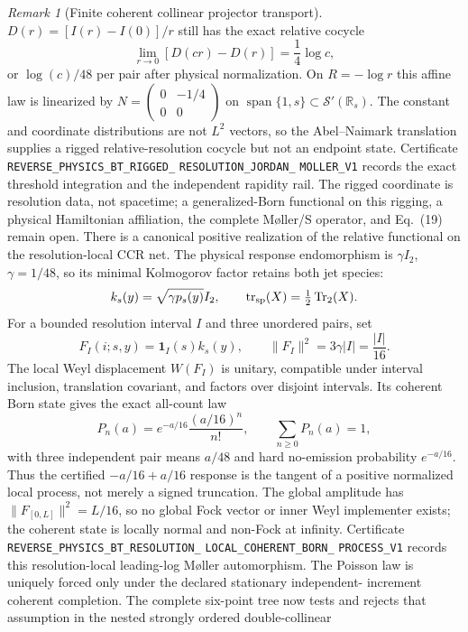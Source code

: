 \documentclass[11pt]{article}
\theoremstyle{definition}
\theoremstyle{remark}
\newtheorem{remark}[theorem]{Remark}
\begin{document}
\begin{remark}[Finite coherent collinear projector transport]
$D(r)=[I(r)-I(0)]/r$ still has the exact relative cocycle
\[
 \lim_{r\to0}[D(cr)-D(r)]=\frac14\log c,
\]
or $\log(c)/48$ per pair after physical normalization.  On $R=-\log r$
this affine law is linearized by
$N=\left(\begin{smallmatrix}0&-1/4\\0&0\end{smallmatrix}\right)$ on
$\operatorname{span}\{1,s\}\subset\mathcal S'(\mathbb R_s)$.
The constant and coordinate distributions are not $L^2$ vectors, so the
Abel--Naimark translation supplies a rigged relative-resolution cocycle but
not an endpoint state.  Certificate
\texttt{REVERSE\_PHYSICS\_BT\_RIGGED\_}
\allowbreak\texttt{RESOLUTION\_JORDAN\_}
\allowbreak\texttt{MOLLER\_V1}
records the exact threshold integration and the independent rapidity rail.
The rigged coordinate is resolution data, not spacetime; a generalized-Born
functional on this rigging, a physical Hamiltonian affiliation, the complete
M\o ller/S operator, and Eq.~(19) remain open.
There is a canonical positive realization of the relative functional on the
resolution-local CCR net.  The physical response endomorphism is
$\gamma I_2$, $\gamma=1/48$, so its minimal Kolmogorov factor retains both
jet species:
\[
 k_s(y)=\sqrt{\gamma p_s(y)}I_2,
 \qquad \operatorname{tr}_{\rm sp}(X)=\tfrac12\operatorname{Tr}_2(X).
\]
For a bounded resolution interval $I$ and three unordered pairs, set
\[
 F_I(i;s,y)=\mathbf1_I(s)k_s(y),
 \qquad
 \|F_I\|^2=3\gamma|I|=\frac{|I|}{16}.
\]
The local Weyl displacement $W(F_I)$ is unitary, compatible under interval
inclusion, translation covariant, and factors over disjoint intervals.  Its
coherent Born state gives the exact all-count law
\[
 P_n(a)=e^{-a/16}\frac{(a/16)^n}{n!},
 \qquad \sum_{n\ge0}P_n(a)=1,
\]
with three independent pair means $a/48$ and hard no-emission probability
$e^{-a/16}$.  Thus the certified $-a/16+a/16$ response is the tangent of a
positive normalized local process, not merely a signed truncation.  The
global amplitude has $\|F_{[0,L]}\|^2=L/16$, so no global Fock vector or
inner Weyl implementer exists; the coherent state is locally normal and
non-Fock at infinity.  Certificate
\texttt{REVERSE\_PHYSICS\_BT\_RESOLUTION\_}
\allowbreak\texttt{LOCAL\_COHERENT\_BORN\_}
\allowbreak\texttt{PROCESS\_V1}
records this resolution-local leading-log M\o ller automorphism.  The Poisson
law is uniquely forced only under the declared stationary independent-
increment coherent completion.  The complete six-point tree now tests and
rejects that assumption in the nested strongly ordered double-collinear

\end{remark}
\end{document}

